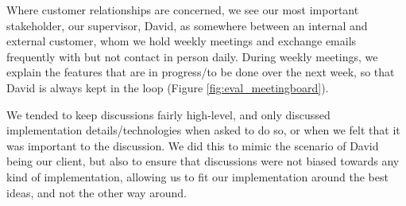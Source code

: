\documentclass[a4paper, titlepage]{article}
\begin{document}
Where customer relationships are concerned, we see our most important stakeholder, our supervisor, David, as somewhere between an internal and external customer, whom we hold weekly meetings and exchange emails frequently with but not contact in person daily. During weekly meetings, we explain the features that are in progress/to be done over the next week, so that David is always kept in the loop (Figure \ref{fig:eval_meetingboard}).

We tended to keep discussions fairly high-level, and only discussed implementation details/technologies when asked to do so, or when we felt that it was important to the discussion. We did this to mimic the scenario of David being our client, but also to ensure that discussions were not biased towards any kind of implementation, allowing us to fit our implementation around the best ideas, and not the other way around.
\end{document}

